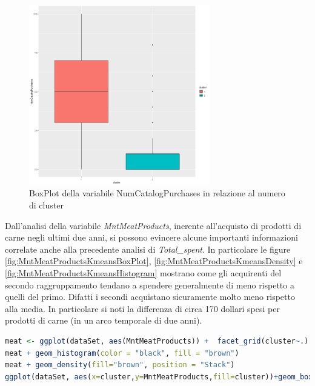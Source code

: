 \documentclass[letterpaper,11pt]{article}
\begin{document}
\begin{figure}[H]
    \centering
    \includegraphics[width=0.7\textwidth]{Img/K-MEANS/KMEANS018.png}
    \caption{BoxPlot della variabile NumCatalogPurchases in relazione al numero di cluster}
    \label{fig:NumCatalogPurchasesKmeansBoxPlot}
\end{figure}

Dall'analisi della variabile \textit{MntMeatProducts}, inerente all'acquisto di prodotti di carne negli ultimi due anni, si possono evincere alcune importanti informazioni correlate anche alla precedente analisi di \textit{Total\_spent}. In particolare le figure \ref{fig:MntMeatProductsKmeansBoxPlot}, \ref{fig:MntMeatProductsKmeansDensity} e \ref{fig:MntMeatProductsKmeansHistogram} mostrano come gli acquirenti del secondo raggruppamento tendano a spendere generalmente di meno rispetto a quelli del primo. Difatti i secondi acquistano sicuramente molto meno rispetto alla media. In particolare si noti la differenza di circa 170 dollari spesi per prodotti di carne (in un arco temporale di due anni).

\begin{lstlisting}[language=R]
meat <- ggplot(dataSet, aes(MntMeatProducts)) +  facet_grid(cluster~.)
meat + geom_histogram(color = "black", fill = "brown") 
meat + geom_density(fill="brown", position = "Stack")
ggplot(dataSet, aes(x=cluster,y=MntMeatProducts,fill=cluster))+geom_boxplot(outlier.colour="black")
\end{lstlisting}
\end{document}
